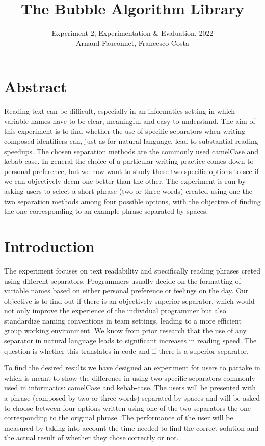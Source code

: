 \documentclass{article}
\title{The Bubble Algorithm Library}
\author{Experiment 2, Experimentation \& Evaluation, 2022\\Arnaud Fauconnet,
	Francesco Costa}
\date{}
\begin{document}
\maketitle
\tableofcontents

\section*{Abstract}
Reading text can be difficult, especially in an informatics setting in which variable names have to be clear, meaningful and 
easy to understand. The aim of this experiment is to find whether the use of specific separators when writing composed identifiers 
can, just as for natural language, lead to substantial reading speedups. The chosen separation methods are the commonly used camelCase and 
kebab-case. In general the choice of a particular writing practice comes down to personal preference, but we now want to study these two 
specific options to see if we can objectively deem one better than the other. The experiment is run by asking users to select a short phrase (two or three words) 
created using one the two separation methods among four possible options, with the objective of finding the one corresponding to an example phrase 
separated by spaces.

\newpage 
\section{Introduction}
The experiment focuses on text readability and specifically reading phrases creted using different separators. Programmers usually decide on the formatting of 
variable names based on either personal preference or feelings on the day. Our objective is to find out if there is an objectively superior separator, which would 
not only improve the experience of the individual programmer but also standardize naming conventions in team settings, leading to a more 
efficient group working environment.
We know from prior research that the use of any separator in natural language leads to significant increases in reading speed. The question is whether this translates in 
code and if there is a superior separator. 

To find the desired results we have designed an experiment for users to partake in which is meant to show the difference in using two specific separators commonly 
used in informatics: camelCase and kebab-case. The users will be presented with a phrase (composed by two or three words) separated by spaces and will be asked to choose between four options 
written using one of the two separators the one corresponding to the original phrase. The performance of the user will be measured by taking into account the time needed to 
find the correct solution and the actual result of whether they chose correctly or not.
\end{document}
